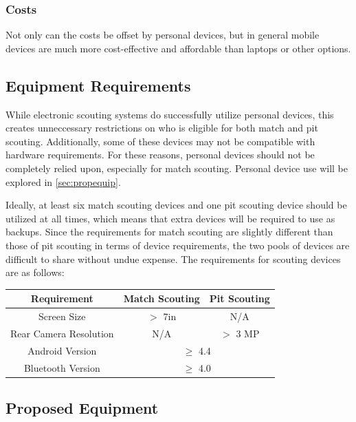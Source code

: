 \documentclass[11pt]{report}
\begin{document}
\subsubsection*{Costs}

Not only can the costs be offset by personal devices, but in general mobile devices are much more cost-effective and affordable than laptops or other options.

\subsection{Equipment Requirements}

While electronic scouting systems do successfully utilize personal devices, this creates unneccessary restrictions on who is eligible for both match and pit scouting. Additionally, some of these devices may not be compatible with hardware requirements. For these reasons, personal devices should not be completely relied upon, especially for match scouting. Personal device use will be explored in \autoref{sec:propequip}. \newline

Ideally, at least six match scouting devices and one pit scouting device should be utilized at all times, which means that extra devices will be required to use as backups. Since the requirements for match scouting are slightly different than those of pit scouting in terms of device requirements, the two pools of devices are difficult to share without undue expense. The requirements for scouting devices are as follows: 

\begin{center}
 \begin{tabular}{||c|c|c||} 
 \hline
 Requirement & Match Scouting & Pit Scouting \\  [0.5ex] 
 \hline \hline
 Screen Size & $>$ 7in & N/A \\ 
 \hline
 Rear Camera Resolution & N/A & $>$ 3 MP \\ 
 \hline
 Android Version & \multicolumn{2}{|c||}{$\geq$ 4.4}  \\
 \hline
 Bluetooth Version & \multicolumn{2}{|c||}{$\geq$ 4.0} \\  [1ex] 
 \hline
\end{tabular}
\end{center}

\subsection{Proposed Equipment}
\label{sec:propequip}
\end{document}
